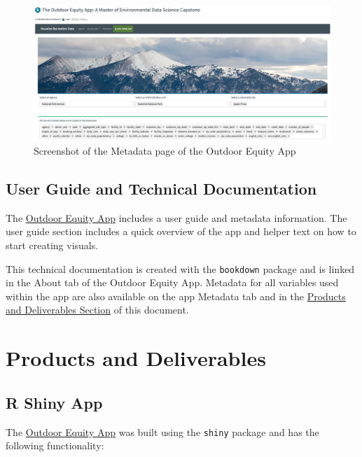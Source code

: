 \documentclass[
  11 pt,
  openany]{book}
\begin{document}
\begin{figure}
\includegraphics[width=5.97in]{images/screenshot_data-download} \caption{Screenshot of the Metadata page of the Outdoor Equity App}\label{fig:app-screenshot6}
\end{figure}

\hypertarget{user-guide-and-technical-documentation}{%
\section{User Guide and Technical Documentation}\label{user-guide-and-technical-documentation}}

The \href{https://shinyapps.bren.ucsb.edu/oe_app/}{Outdoor Equity App} includes a user guide and metadata information. The user guide section includes a quick overview of the app and helper text on how to start creating visuals.

This technical documentation is created with the \texttt{bookdown} package \citep{R-bookdown} and is linked in the About tab of the Outdoor Equity App. Metadata for all variables used within the app are also available on the app Metadata tab and in the \protect\hyperlink{products-and-deliverables}{Products and Deliverables Section} of this document.

\hypertarget{products-and-deliverables}{%
\chapter{Products and Deliverables}\label{products-and-deliverables}}

\hypertarget{r-shiny-app}{%
\section{R Shiny App}\label{r-shiny-app}}

The \href{https://shinyapps.bren.ucsb.edu/oe_app/}{Outdoor Equity App} was built using the \texttt{shiny} package \citep{R-shiny} and has the following functionality:
\end{document}
